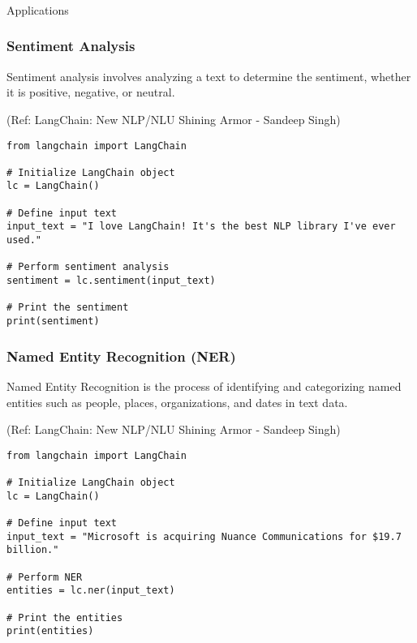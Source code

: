 \begin{frame}[fragile]\frametitle{}
\begin{center}
{\Large Applications}
\end{center}
\end{frame}


\begin{frame}[fragile]\frametitle{Sentiment Analysis}

Sentiment analysis involves analyzing a text to determine the sentiment, whether it is positive, negative, or neutral. 

{\tiny (Ref: LangChain: New NLP/NLU Shining Armor - Sandeep Singh)}

\begin{lstlisting}
from langchain import LangChain

# Initialize LangChain object
lc = LangChain()

# Define input text
input_text = "I love LangChain! It's the best NLP library I've ever used."

# Perform sentiment analysis
sentiment = lc.sentiment(input_text)

# Print the sentiment
print(sentiment)
\end{lstlisting}	  

\end{frame}


\begin{frame}[fragile]\frametitle{Named Entity Recognition (NER)}

Named Entity Recognition is the process of identifying and categorizing named entities such as people, places, organizations, and dates in text data.

{\tiny (Ref: LangChain: New NLP/NLU Shining Armor - Sandeep Singh)}

\begin{lstlisting}
from langchain import LangChain

# Initialize LangChain object
lc = LangChain()

# Define input text
input_text = "Microsoft is acquiring Nuance Communications for $19.7 billion."

# Perform NER
entities = lc.ner(input_text)

# Print the entities
print(entities)
\end{lstlisting}	  

\end{frame}


